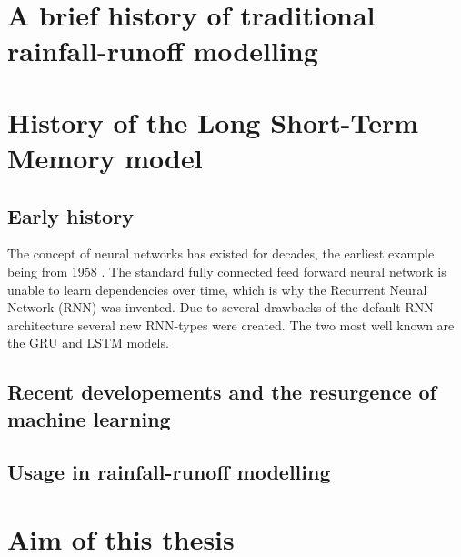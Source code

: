\section{A brief history of traditional rainfall-runoff modelling}

\section{History of the Long Short-Term Memory model}
\subsection{Early history}
The concept of neural networks has existed for decades, the earliest example being 
from 1958 \cite{rosenblatt1958perceptron}. The standard fully connected feed forward 
neural network is unable to learn dependencies over time, which is why the Recurrent 
Neural Network (RNN) was invented. \citationneeded
Due to several drawbacks of the default RNN architecture several new RNN-types 
were created. The two most well known are the GRU and LSTM models. \citationneeded
\subsection{Recent developements and the resurgence of machine learning}
\subsection{Usage in rainfall-runoff modelling}

\section{Aim of this thesis}

